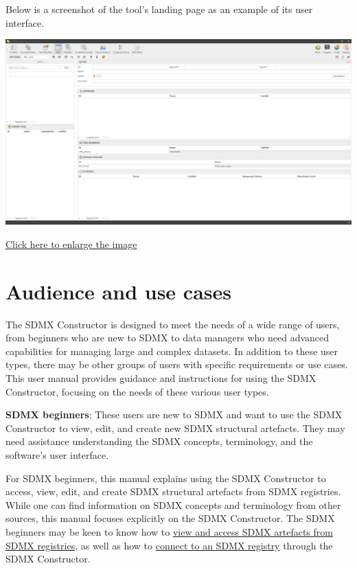 \documentclass[
]{book}
\begin{document}
Below is a screenshot of the tool's landing page as an example of its user interface.

\begin{center}\includegraphics[width=1\linewidth]{./images/image001} \end{center}

\href{images/image001.png}{Click here to enlarge the image}

\hypertarget{audience-and-use-cases}{%
\section*{Audience and use cases}\label{audience-and-use-cases}}

The SDMX Constructor is designed to meet the needs of a wide range of users, from beginners who are new to SDMX to data managers who need advanced capabilities for managing large and complex datasets. In addition to these user types, there may be other groups of users with specific requirements or use cases. This user manual provides guidance and instructions for using the SDMX Constructor, focusing on the needs of these various user types.

\textbf{SDMX beginners}: These users are new to SDMX and want to use the SDMX Constructor to view, edit, and create new SDMX structural artefacts. They may need assistance understanding the SDMX concepts, terminology, and the software's user interface.

For SDMX beginners, this manual explains using the SDMX Constructor to access, view, edit, and create SDMX structural artefacts from SDMX registries. While one can find information on SDMX concepts and terminology from other sources, this manual focuses explicitly on the SDMX Constructor. The SDMX beginners may be keen to know how to \protect\hyperlink{accessing-sdmx}{view and access SDMX artefacts from SDMX registries}, as well as how to \protect\hyperlink{connecting-to}{connect to an SDMX registry} through the SDMX Constructor.
\end{document}
